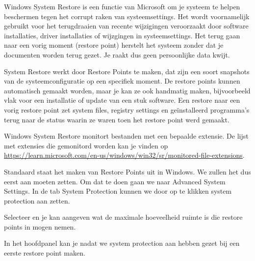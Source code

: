 Windows System Restore is een functie van Microsoft om je systeem te helpen beschermen tegen het corrupt raken van systeemsettings. Het wordt voornamelijk gebruikt voor het terugdraaien van recente wijzigingen veroorzaakt door software installaties, driver installaties of wijzgingen in systeemsettings. Het terug gaan naar een vorig moment (restore point) herstelt het systeem zonder dat je documenten worden terug gezet. Je raakt dus geen persoonlijke data kwijt.

System Restore werkt door Restore Points te maken, dat zijn een soort snapshots van de systeemconfiguratie op een specifiek moment. De restore points kunnen automatisch gemaakt worden, maar je kan ze ook handmatig maken, bijvoorbeeld vlak voor een installatie of update van een stuk software. Een restore naar een vorig restore point zet system files, registry settings en ge\"installeerd programma's terug naar de status waarin ze waren toen het restore point werd gemaakt.

Windows System Restore monitort bestanden met een bepaalde extensie. De lijst met extensies die gemonitord worden kan je vinden op \url{https://learn.microsoft.com/en-us/windows/win32/sr/monitored-file-extensions}.

Standaard staat het maken van Restore Points uit in Windows. We zullen het dus eerst aan moeten zetten. Om dat te doen gaan we naar Advanced System Settings. In de tab System Protection kunnen we door op  te klikken system protection aan zetten.

\begin{minipage}[t]{\linewidth}
\raggedright
{}
\end{minipage}

Selecteer  en je kan aangeven wat de maximale hoeveelheid ruimte is die restore points in mogen nemen.

In het hoofdpanel kan je nadat we system protection aan hebben gezet bij  een eerste restore point maken.



